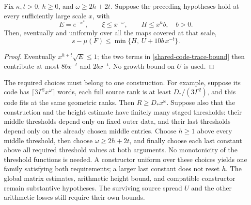 \begin{corollary}\label{shared-code-height-separation}
Fix \(\kappa,t>0\), \(h\ge0\), and \(\omega\ge2h+2t\).
Suppose the preceding hypotheses hold at every sufficiently large
scale \(x\), with
\[
 E=e^{-x^\kappa},\qquad \xi\le x^{-\omega},\qquad
 H\le x^h b,\quad b>0.
\]
Then, eventually and uniformly over all the maps covered at that scale,
\[
 s-\mu(F)\le\min\{H,\ U+10b\,x^{-t}\}.
\]
\end{corollary}
\begin{proof}
Eventually \(x^{h+t}\sqrt E\le1\); the two terms in
\eqref{shared-code-trace-bound} then contribute at most
\(8b x^{-t}\) and \(2b x^{-t}\). No growth bound on \(U\) is used.
\end{proof}

The required choices must belong to one construction. For example,
suppose its code has \(\lceil3\Gamma^2x^\omega\rceil\) words,
each full source rank is at least \(D_*/(3\Gamma^2)\), and this code
fits at the same geometric ranks. Then \(R\ge D_*x^\omega\).
Suppose also that the construction and the height estimate have
finitely many staged thresholds: their middle thresholds depend only
on fixed outer data, and their last thresholds depend only on the
already chosen middle entries. Choose \(h\ge1\) above every middle
threshold, then choose \(\omega\ge2h+2t\), and finally choose each
last constant above all required threshold values at both arguments.
No monotonicity of the threshold functions is needed. A constructor
uniform over these choices yields one family satisfying both
requirements; a larger last constant does not reset \(h\).
The global matrix estimates, arithmetic height bound, and compatible
constructor remain substantive hypotheses. The surviving source
spread \(U\) and the other arithmetic losses still require their
own bounds.
